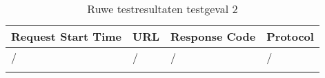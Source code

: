 \begin{longtable}[c]{@{}llll@{}}
    \toprule
    Request Start Time & URL & Response Code & Protocol \\* \midrule
    \endhead
    / & / & / & / \\* \bottomrule
    \caption{Ruwe testresultaten testgeval 2}
    \label{tab:my-table}\\
\end{longtable}